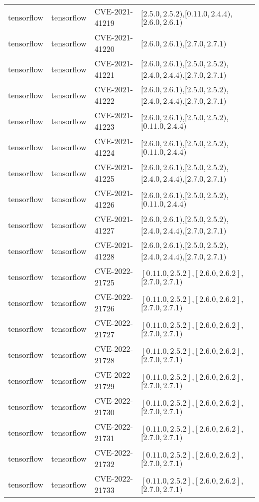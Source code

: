 \begin{tabular}{llll}
tensorflow & tensorflow & CVE-2021-41219 & $[2.5.0,2.5.2)$,$[0.11.0,2.4.4)$,$[2.6.0,2.6.1)$ \\
tensorflow & tensorflow & CVE-2021-41220 & $[2.6.0,2.6.1)$,$[2.7.0,2.7.1)$ \\
tensorflow & tensorflow & CVE-2021-41221 & $[2.6.0,2.6.1)$,$[2.5.0,2.5.2)$,$[2.4.0,2.4.4)$,$[2.7.0,2.7.1)$ \\
tensorflow & tensorflow & CVE-2021-41222 & $[2.6.0,2.6.1)$,$[2.5.0,2.5.2)$,$[2.4.0,2.4.4)$,$[2.7.0,2.7.1)$ \\
tensorflow & tensorflow & CVE-2021-41223 & $[2.6.0,2.6.1)$,$[2.5.0,2.5.2)$,$[0.11.0,2.4.4)$ \\
tensorflow & tensorflow & CVE-2021-41224 & $[2.6.0,2.6.1)$,$[2.5.0,2.5.2)$,$[0.11.0,2.4.4)$ \\
tensorflow & tensorflow & CVE-2021-41225 & $[2.6.0,2.6.1)$,$[2.5.0,2.5.2)$,$[2.4.0,2.4.4)$,$[2.7.0,2.7.1)$ \\
tensorflow & tensorflow & CVE-2021-41226 & $[2.6.0,2.6.1)$,$[2.5.0,2.5.2)$,$[0.11.0,2.4.4)$ \\
tensorflow & tensorflow & CVE-2021-41227 & $[2.6.0,2.6.1)$,$[2.5.0,2.5.2)$,$[2.4.0,2.4.4)$,$[2.7.0,2.7.1)$ \\
tensorflow & tensorflow & CVE-2021-41228 & $[2.6.0,2.6.1)$,$[2.5.0,2.5.2)$,$[2.4.0,2.4.4)$,$[2.7.0,2.7.1)$ \\
tensorflow & tensorflow & CVE-2022-21725 & $[0.11.0,2.5.2]$,$[2.6.0,2.6.2]$,$[2.7.0,2.7.1)$ \\
tensorflow & tensorflow & CVE-2022-21726 & $[0.11.0,2.5.2]$,$[2.6.0,2.6.2]$,$[2.7.0,2.7.1)$ \\
tensorflow & tensorflow & CVE-2022-21727 & $[0.11.0,2.5.2]$,$[2.6.0,2.6.2]$,$[2.7.0,2.7.1)$ \\
tensorflow & tensorflow & CVE-2022-21728 & $[0.11.0,2.5.2]$,$[2.6.0,2.6.2]$,$[2.7.0,2.7.1)$ \\
tensorflow & tensorflow & CVE-2022-21729 & $[0.11.0,2.5.2]$,$[2.6.0,2.6.2]$,$[2.7.0,2.7.1)$ \\
tensorflow & tensorflow & CVE-2022-21730 & $[0.11.0,2.5.2]$,$[2.6.0,2.6.2]$,$[2.7.0,2.7.1)$ \\
tensorflow & tensorflow & CVE-2022-21731 & $[0.11.0,2.5.2]$,$[2.6.0,2.6.2]$,$[2.7.0,2.7.1)$ \\
tensorflow & tensorflow & CVE-2022-21732 & $[0.11.0,2.5.2]$,$[2.6.0,2.6.2]$,$[2.7.0,2.7.1)$ \\
tensorflow & tensorflow & CVE-2022-21733 & $[0.11.0,2.5.2]$,$[2.6.0,2.6.2]$,$[2.7.0,2.7.1)$ \\

\end{tabular}
